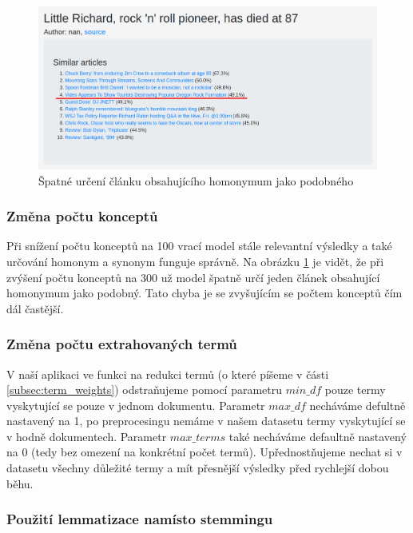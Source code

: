 \documentclass[11pt]{scrartcl} %
\begin{document}
\begin{figure}[h] %
	\centering
	\includegraphics[width=1\columnwidth]{images/homonym_bad.png}
	\caption{Špatné určení článku obsahujícího homonymum jako podobného}
	\label{fig:homonym_bad}
\end{figure}

\subsubsection{Změna počtu konceptů}
Při snížení počtu konceptů na 100 vrací model stále relevantní výsledky a také určování homonym a synonym funguje správně. Na obrázku \ref{fig:homonym_bad} je vidět, že při zvýšení počtu konceptů na 300 už model špatně určí jeden článek obsahující homonymum jako podobný. Tato chyba je se zvyšujícím se počtem konceptů čím dál častější.

\subsubsection{Změna počtu extrahovaných termů}

V naší aplikaci ve funkci na redukci termů (o které píšeme v části \ref{subsec:term_weights}) odstraňujeme pomocí parametru $\mathit{min\_df}$ pouze termy vyskytující se pouze v jednom dokumentu. Parametr $\mathit{max\_df}$ necháváme defultně nastavený na 1, po preprocesingu nemáme v našem datasetu termy vyskytující se v hodně dokumentech. Parametr $\mathit{max\_terms}$ také necháváme defaultně nastavený na 0 (tedy bez omezení na konkrétní počet termů). Upřednostňujeme nechat si v datasetu všechny důležité termy a mít přesnější výsledky před rychlejší dobou běhu.

\subsubsection{Použití lemmatizace namísto stemmingu}
\end{document}
